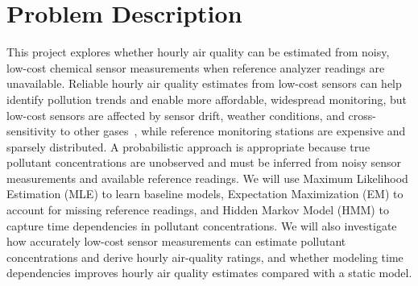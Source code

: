 \section{Problem Description}
\label{sec:problem}


    This project explores whether hourly air quality can be estimated from noisy, 
low-cost chemical sensor measurements when reference analyzer readings are unavailable.
    Reliable hourly air quality estimates from low-cost sensors can help identify pollution trends and enable 
more affordable, widespread monitoring, but low-cost sensors are affected by sensor drift, weather conditions, 
and cross-sensitivity to other gases~\citep{devito2008calibration}, while reference monitoring stations are expensive and sparsely distributed.
    A probabilistic approach is appropriate because true pollutant concentrations are unobserved and must be 
inferred from noisy sensor measurements and available reference readings.
    We will use Maximum Likelihood Estimation (MLE) to learn baseline models, Expectation Maximization (EM) 
to account for missing reference readings, and Hidden Markov Model (HMM) to capture time dependencies in 
pollutant concentrations.
    We will also investigate how accurately low-cost sensor measurements can estimate pollutant concentrations 
and derive hourly air-quality ratings, and whether modeling time dependencies improves hourly air quality 
estimates compared with a static model.
      

